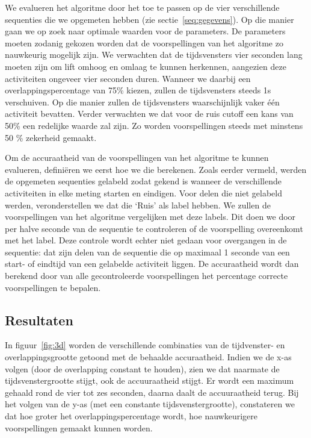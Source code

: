 \documentclass{article}
\begin{document}
We evalueren het algoritme door het toe te passen op de vier verschillende sequenties die we opgemeten hebben (zie sectie~\ref{seq:gegevens}). Op die manier gaan we op zoek naar optimale waarden voor de parameters. De parameters moeten zodanig gekozen worden dat de voorspellingen van het algoritme zo nauwkeurig mogelijk zijn. We verwachten dat de tijdsvensters vier seconden lang moeten zijn om lift omhoog en omlaag te kunnen herkennen, aangezien deze activiteiten ongeveer vier seconden duren. Wanneer we daarbij een overlappingspercentage van 75\% kiezen, zullen de tijdsvensters steeds 1s verschuiven. Op die manier zullen de tijdsvensters waarschijnlijk vaker \'e\'en activiteit bevatten. Verder verwachten we dat voor de ruis cutoff een kans van 50\% een redelijke waarde zal zijn. Zo worden voorspellingen steeds met minstens 50 \% zekerheid gemaakt. 

Om de accuraatheid van de voorspellingen van het algoritme te kunnen evalueren, defini\"eren we eerst hoe we die berekenen. Zoals eerder vermeld, werden de opgemeten sequenties gelabeld zodat gekend is wanneer de verschillende activiteiten in elke meting starten en eindigen. Voor delen die niet gelabeld werden, veronderstellen we dat die `Ruis' als label hebben. We zullen de voorspellingen van het algoritme vergelijken met deze labels. Dit doen we door per halve seconde van de sequentie te controleren of de voorspelling overeenkomt met het label. Deze controle wordt echter niet gedaan voor overgangen in de sequentie: dat zijn delen van de sequentie die op maximaal 1 seconde van een start- of eindtijd van een gelabelde activiteit liggen. De accuraatheid wordt dan berekend door van alle gecontroleerde voorspellingen het percentage correcte voorspellingen te bepalen.

\subsection{Resultaten}

In figuur~\ref{fig:3d} worden de verschillende combinaties van de tijdvenster- en overlappingsgrootte getoond met de behaalde accuraatheid. Indien we de x-as volgen (door de overlapping constant te houden), zien we dat naarmate de tijdsvenstergrootte stijgt, ook de accuuraatheid stijgt. Er wordt een maximum gehaald rond de vier tot zes seconden, daarna daalt de accuuraatheid terug. Bij het volgen van de y-as (met een constante tijdsvenstergrootte), constateren we dat hoe groter het overlappingspercentage wordt, hoe nauwkeurigere voorspellingen gemaakt kunnen worden.
\end{document}
